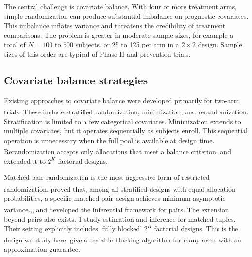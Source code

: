 \documentclass[
  11pt,
]{article}
\begin{document}
The central challenge is covariate balance. With four or
more treatment arms, simple randomization can produce
substantial imbalance on prognostic covariates. This
imbalance inflates variance and threatens the credibility of
treatment comparisons. The problem is greater in moderate
sample sizes, for example a total of \(N = 100\) to \(500\)
subjects, or 25 to 125 per arm in a \(2 \times 2\) design.
Sample sizes of this order are typical of Phase II and
prevention trials.

\subsection{Covariate balance strategies}\label{covariate-balance-strategies}

Existing approaches to covariate balance were developed
primarily for two-arm trials. These include stratified
randomization\textsuperscript{},
minimization\textsuperscript{}, and
rerandomization\textsuperscript{}. Stratification
is limited to a few categorical covariates. Minimization
extends to multiple covariates, but it operates sequentially
as subjects enroll. This sequential operation is unnecessary
when the full pool is available at design time.
Rerandomization accepts only allocations that meet a balance
criterion.\textsuperscript{} and\textsuperscript{} extended it to \(2^K\)
factorial designs.

Matched-pair randomization is the most aggressive form of
restricted randomization.\textsuperscript{} proved that, among all
stratified designs with equal allocation probabilities, a
specific matched-pair design achieves minimum asymptotic
variance.\textsuperscript{},\textsuperscript{},\textsuperscript{} and\textsuperscript{} developed the inferential
framework for pairs. The extension beyond pairs also exists.
1 study estimation and inference for
matched tuples. Their setting explicitly includes `fully
blocked' \(2^K\) factorial designs. This is the design we
study here.\textsuperscript{} give a scalable
blocking algorithm for many arms with an approximation
guarantee.
\end{document}
